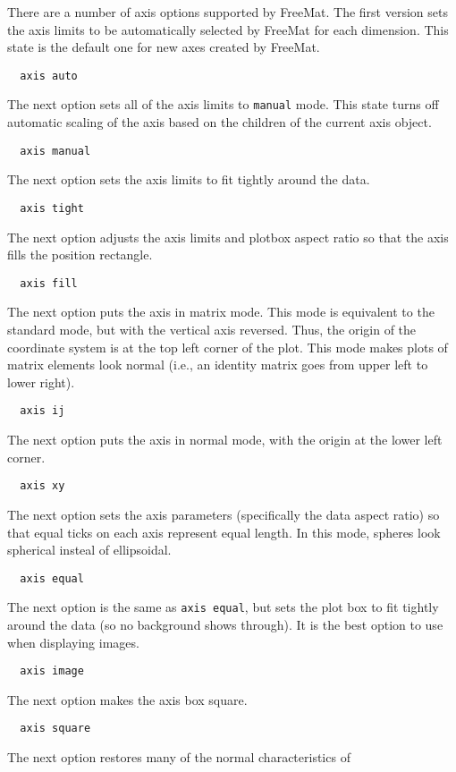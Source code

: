 There are a number of axis options supported by FreeMat.
The first version sets the axis limits to be automatically
selected by FreeMat for each dimension.  This state is the
default one for new axes created by FreeMat.
\begin{verbatim}
  axis auto
\end{verbatim}
The next option sets all of the axis limits to \verb|manual|
mode.  This state turns off automatic scaling of the axis
based on the children of the current axis object.  
\begin{verbatim}
  axis manual
\end{verbatim}
The next option sets the axis limits to fit tightly around
the data.
\begin{verbatim}
  axis tight
\end{verbatim}
The next option adjusts the axis limits and plotbox aspect
ratio so that the axis fills the position rectangle.
\begin{verbatim}
  axis fill
\end{verbatim}
The next option puts the axis in matrix mode.  This mode
is equivalent to the standard mode, but with the vertical
axis reversed.  Thus, the origin of the coordinate system
is at the top left corner of the plot.  This mode makes
plots of matrix elements look normal (i.e., an identity
matrix goes from upper left to lower right).
\begin{verbatim}
  axis ij
\end{verbatim}
The next option puts the axis in normal mode, with the origin
at the lower left corner.
\begin{verbatim}
  axis xy
\end{verbatim}
The next option sets the axis parameters (specifically the
data aspect ratio) so that equal ticks on each axis represent
equal length.  In this mode, spheres look spherical insteal of
ellipsoidal.
\begin{verbatim}
  axis equal
\end{verbatim}
The next option is the same as \verb|axis equal|, but sets the
plot box to fit tightly around the data (so no background shows
through).  It is the best option to use when displaying images.
\begin{verbatim}
  axis image
\end{verbatim}
The next option makes the axis box square.
\begin{verbatim}
  axis square
\end{verbatim}
The next option restores many of the normal characteristics of
